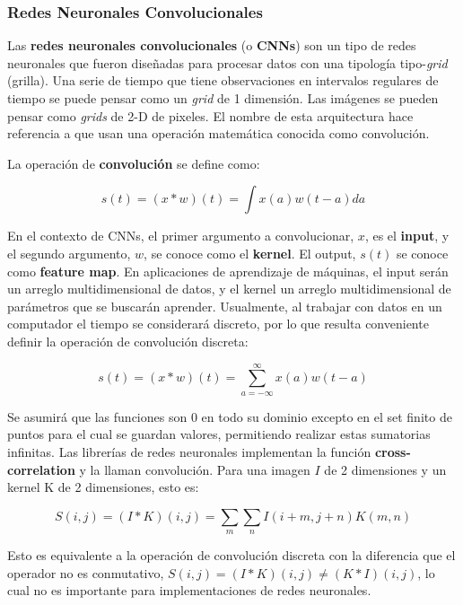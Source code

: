 \subsubsection{Redes Neuronales Convolucionales}

Las \textbf{redes neuronales convolucionales} (o \textbf{CNNs}) son un tipo de redes neuronales que fueron dise{\~{n}}adas para procesar datos con una tipolog\'ia tipo-\textit{grid} (grilla). Una serie de tiempo que tiene observaciones en intervalos regulares de tiempo se puede pensar como un \textit{grid} de 1 dimensi\'on. Las im\'agenes se pueden pensar como \textit{grids} de 2-D de pixeles. El nombre de esta arquitectura hace referencia a que usan una operaci\'on matem\'atica conocida como convoluci\'on.

La operaci\'on de \textbf{convoluci\'on} se define como:

\begin{equation}
s(t) = (x * w)(t) = \int x(a)w(t-a)da
\end{equation}

En el contexto de CNNs, el primer argumento a convolucionar, $x$, es el \textbf{input}, y el segundo argumento, $w$, se conoce como el \textbf{kernel}. El output, $s(t)$ se conoce como \textbf{feature map}. En aplicaciones de aprendizaje de m\'aquinas, el input ser\'an un arreglo multidimensional de datos, y el kernel un arreglo multidimensional de par\'ametros que se buscar\'an aprender. Usualmente, al trabajar con datos en un computador el tiempo se considerar\'a discreto, por lo que resulta conveniente definir la operaci\'on de convoluci\'on discreta:

\begin{equation}
s(t) = (x * w)(t) = \sum_{a=-\infty}^{\infty} x(a)w(t-a)
\end{equation}

Se asumir\'a que las funciones son 0 en todo su dominio excepto en el set finito de puntos para el cual se guardan valores, permitiendo realizar estas sumatorias infinitas. Las librer\'ias de redes neuronales implementan la funci\'on \textbf{cross-correlation} y la llaman convoluci\'on. Para una imagen $I$ de 2 dimensiones y un kernel K de 2 dimensiones, esto es: 

\begin{equation}
S(i,j) = (I * K)(i,j) = \sum_{m}\sum_{n} I(i+m,j+n)K(m,n)
\end{equation}

Esto es equivalente a la operaci\'on de convoluci\'on discreta con la diferencia que el operador no es conmutativo, $S(i,j) = (I * K)(i,j) \neq (K * I)(i,j)$, lo cual no es importante para implementaciones de redes neuronales. 

